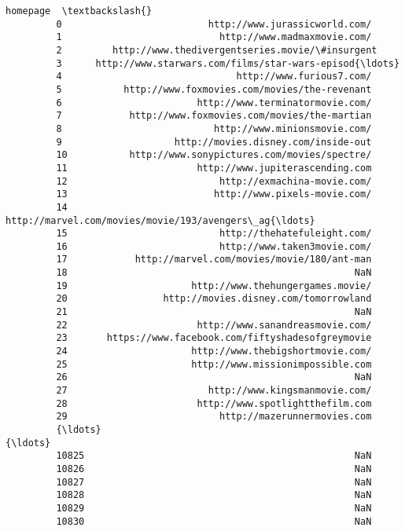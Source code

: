 \documentclass[11pt]{article}
\begin{document}
\begin{Verbatim}[commandchars=\\\{\}]
                                                         homepage  \textbackslash{}
         0                          http://www.jurassicworld.com/   
         1                            http://www.madmaxmovie.com/   
         2         http://www.thedivergentseries.movie/\#insurgent   
         3      http://www.starwars.com/films/star-wars-episod{\ldots}   
         4                               http://www.furious7.com/   
         5           http://www.foxmovies.com/movies/the-revenant   
         6                        http://www.terminatormovie.com/   
         7            http://www.foxmovies.com/movies/the-martian   
         8                           http://www.minionsmovie.com/   
         9                    http://movies.disney.com/inside-out   
         10           http://www.sonypictures.com/movies/spectre/   
         11                       http://www.jupiterascending.com   
         12                           http://exmachina-movie.com/   
         13                          http://www.pixels-movie.com/   
         14     http://marvel.com/movies/movie/193/avengers\_ag{\ldots}   
         15                           http://thehatefuleight.com/   
         16                           http://www.taken3movie.com/   
         17            http://marvel.com/movies/movie/180/ant-man   
         18                                                   NaN   
         19                      http://www.thehungergames.movie/   
         20                 http://movies.disney.com/tomorrowland   
         21                                                   NaN   
         22                       http://www.sanandreasmovie.com/   
         23       https://www.facebook.com/fiftyshadesofgreymovie   
         24                      http://www.thebigshortmovie.com/   
         25                      http://www.missionimpossible.com   
         26                                                   NaN   
         27                         http://www.kingsmanmovie.com/   
         28                       http://www.spotlightthefilm.com   
         29                           http://mazerunnermovies.com   
         {\ldots}                                                  {\ldots}   
         10825                                                NaN   
         10826                                                NaN   
         10827                                                NaN   
         10828                                                NaN   
         10829                                                NaN   
         10830                                                NaN   

\end{Verbatim}
\end{document}
